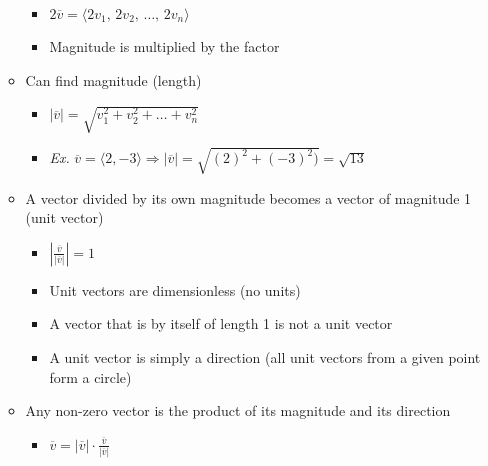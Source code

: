 \begin{itemize}
\begin{itemize}
\begin{itemize}
          \item $2\overline{v}=\langle 2v_1,\,2v_2,\,\dots,\,2v_n \rangle$

          \item Magnitude is multiplied by the factor

        \end{itemize}

      \item Can find magnitude (length)

        \begin{itemize}

          \item $|\overline{v}|=\sqrt{v_1^2+v_2^2+\dots+v_n^2}$

          \item \textit{Ex.} $\overline{v}=\langle 2, -3 \rangle \Rightarrow |\overline{v}| = \sqrt{(2)^2 + (-3)^2)} = \sqrt{13}$

        \end{itemize}

      \item A vector divided by its own magnitude becomes a vector of magnitude 1 (unit vector)

        \begin{itemize}

          \item $|\frac{\overline{v}}{|\overline{v}|}|=1$

          \item Unit vectors are dimensionless (no units)

          \item A vector that is by itself of length 1 is not a unit vector

          \item A unit vector is simply a direction (all unit vectors from a given point form a circle)

        \end{itemize}

      \item Any non-zero vector is the product of its magnitude and its direction

        \begin{itemize}

          \item $\overline{v} = |\overline{v}| \cdot \frac{\overline{v}}{|\overline{v}|}$

        \end{itemize}


\end{itemize}
\end{itemize}

